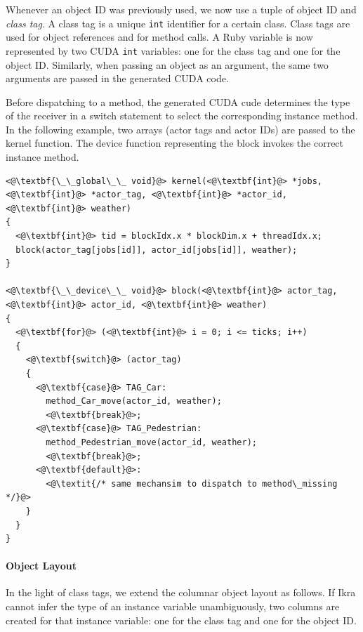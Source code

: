 \documentclass[preprint]{sigplanconf}
\begin{document}
Whenever an object ID was previously used, we now use a tuple of object ID and \emph{class tag}. A class tag is a unique \texttt{int} identifier for a certain class. Class tags are used for object references and for method calls. A Ruby variable is now represented by two CUDA \texttt{int} variables: one for the class tag and one for the object ID. Similarly, when passing an object as an argument, the same two arguments are passed in the generated CUDA code.

Before dispatching to a method, the generated CUDA cude determines the type of the receiver in a switch statement to select the corresponding instance method. In the following example, two arrays (actor tags and actor IDs) are passed to the kernel function. The device function representing the block invokes the correct instance method.

\lstset{language=C++}
\begin{lstlisting}
<@\textbf{\_\_global\_\_ void}@> kernel(<@\textbf{int}@> *jobs, <@\textbf{int}@> *actor_tag, <@\textbf{int}@> *actor_id, <@\textbf{int}@> weather)
{
  <@\textbf{int}@> tid = blockIdx.x * blockDim.x + threadIdx.x;
  block(actor_tag[jobs[id]], actor_id[jobs[id]], weather);
}

<@\textbf{\_\_device\_\_ void}@> block(<@\textbf{int}@> actor_tag, <@\textbf{int}@> actor_id, <@\textbf{int}@> weather)
{
  <@\textbf{for}@> (<@\textbf{int}@> i = 0; i <= ticks; i++)
  {
    <@\textbf{switch}@> (actor_tag)
    {
      <@\textbf{case}@> TAG_Car:
        method_Car_move(actor_id, weather);
        <@\textbf{break}@>;
      <@\textbf{case}@> TAG_Pedestrian:
        method_Pedestrian_move(actor_id, weather);
        <@\textbf{break}@>;
      <@\textbf{default}@>:
        <@\textit{/* same mechansim to dispatch to method\_missing */}@>
    }
  }
}
\end{lstlisting}

\paragraph{Object Layout}
In the light of class tags, we extend the columnar object layout as follows. If Ikra cannot infer the type of an instance variable unambiguously, two columns are created for that instance variable: one for the class tag and one for the object ID.
\end{document}
